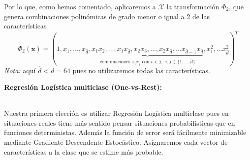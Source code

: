 \documentclass[11pt,a4paper]{article}
\theoremstyle{definition}
\newcommand{\R}{\mathbb{R}}
\begin{document}
	Por lo que, como hemos comentado, aplicaremos a  $\mathcal{X}$ la transformación $\Phi_2$, que genera combinaciones polinómicas de grado menor o igual a 2 de las características $$\Phi_2(\mathbf{x})=(1,x_1,\ldots, x_{\hat d},\underbrace{x_1x_2,\ldots ,x_1x_{\hat d},x_2x_3,\ldots ,x_2x_{\hat d},  \ldots
	 x_{\hat d-1}x_{\hat d}}_{\text{combinaciones } x_ix_j \text{ con } i<j,\ \  i,j\in \{1,\ldots , \hat d\}}, x_1^2,\ldots x_{\hat d}^2)^T$$
	\textit{Nota:} aquí $\hat d< d=64$ pues no utilizaremos todas las características.%
	
	
	\textbf{Regresión Logística multiclase (One-vs-Rest):} $\quad \quad \quad \quad \quad \quad \quad \quad \quad \quad \quad \quad \quad \quad \quad \quad \quad  $ %
	
	Nuestra primera elección es utilizar Regresión Logística multiclase pues en situaciones reales tiene más sentido pensar situaciones probabilísticas que en funciones deterministas. Además la función de error será fácilmente minimizable mediante Gradiente Descendente Estocástico. Asignaremos cada vector de características a la clase que se estime más probable.
	
\end{document}
